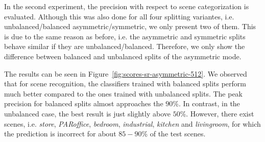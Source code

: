 \documentclass{vldb}
\begin{document}
In the second experiment, the precision with respect to scene categorization is
evaluated. Although this was also done for all four splitting variantes, i.e.
unbalanced/balanced asymmetric/symmetric, we only present two of them. This is
due to the same reason as before, i.e. the asymmetric and symmetric splits behave
similar if they are unbalanced/balanced. Therefore, we only show the difference
between balanced and unbalanced splits of the asymmetric mode.

The results can be seen in Figure~\ref{fig:scores-sr-asymmetric-512}. We
observed that for scene recognition, the classifiers trained with balanced splits
perform much better compared to the ones trained with unbalanced splits. The peak
precision for balanced splits almost approaches the $90$\%. In contrast, in the
unbalanced case, the best result is just slightly above $50$\%. However, there
exist scenes, i.e. \emph{store}, \emph{PARoffice}, \emph{bedroom},
\emph{industrial},  \emph{kitchen} and \emph{livingroom}, for which the prediction
is incorrect for about $85 - 90$\% of the test scenes.
\end{document}
